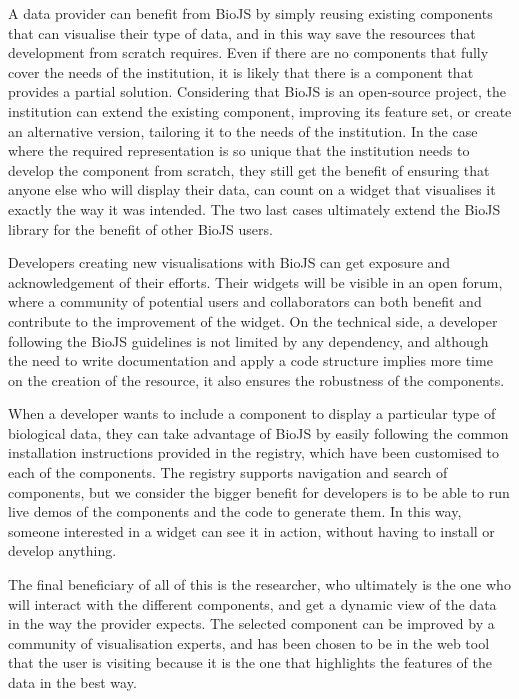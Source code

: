 A data provider can benefit from BioJS by simply reusing existing components that can visualise their type of data, and in this way save the resources that development from scratch requires. Even if there are no components that fully cover the needs of the institution, it is likely that there is a component that provides a partial solution.  Considering that BioJS is an open-source project, the institution can extend the existing component, improving its feature set, or create an alternative version, tailoring it to the needs of the institution. In the case where the required representation is so unique that the institution needs to develop the component from scratch, they still get the benefit of ensuring that anyone else who will display their data, can count on a widget that visualises it exactly the way it was intended. The two last cases ultimately extend the BioJS library for the benefit of other BioJS users.

Developers creating new visualisations with BioJS can get exposure and acknowledgement of their efforts. Their widgets will be visible in an open forum, where a community of potential users and collaborators can both benefit and contribute to the improvement of the widget. On the technical side, a developer following the BioJS guidelines is not limited by any dependency, and although the need to write documentation and apply a code structure implies more time on the creation of the resource, it also ensures the robustness of the components.

When a developer wants to include a component to display a particular type of biological data, they can take advantage of BioJS by easily following the common installation instructions provided in the registry, which have been customised to each of the components. The registry supports navigation and search of components, but we consider the bigger benefit for developers is to be able to run live demos of the components and the code to generate them. In this way, someone interested in a widget can see it in action, without having to install or develop anything.

The final beneficiary of all of this is the researcher, who ultimately is the one who will interact with the different components, and get a dynamic view of the data in the way the provider expects.  The selected component can be improved by a community of visualisation experts, and has been chosen to be in the web tool that the user is visiting because it is the one that highlights the features of the data in the best way.


